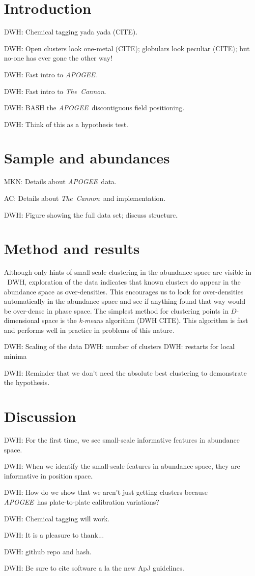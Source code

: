 \documentclass[12pt, letterpaper, preprint]{aastex}
\newcommand{\acronym}[1]{{\small{#1}}}
\newcommand{\project}[1]{\textsl{#1}}
\newcommand{\apogee}{\acronym{\project{APOGEE}}}
\newcommand{\thecannon}{\project{The~Cannon}}
\begin{document}
\section{Introduction}

DWH: Chemical tagging yada yada (CITE).

DWH: Open clusters look one-metal (CITE); globulars look peculiar (CITE); but no-one has ever gone the other way! 

DWH: Fast intro to \apogee.

DWH: Fast intro to \thecannon.

DWH: BASH the \apogee\ discontiguous field positioning.

DWH: Think of this as a hypothesis test.

\section{Sample and abundances}

MKN: Details about \apogee\ data.

AC: Details about \thecannon\ and implementation.

DWH: Figure showing the full data set; discuss structure.

\section{Method and results}

Although only hints of small-scale clustering in the abundance space
are visible in \figurename~DWH, exploration of the data indicates that
known clusters do appear in the abundance space as over-densities.
This encourages us to look for over-densities automatically in the
abundance space and see if anything found that way would be over-dense
in phase space.
The simplest method for clustering points in $D$-dimensional space is
the \emph{k-means} algorithm (DWH CITE).
This algorithm is fast and performs well in practice in problems of
this nature.

DWH: Scaling of the data
DWH: number of clusters
DWH: restarts for local minima

DWH: Reminder that we don't need the absolute best clustering to
demonstrate the hypothesis.

\section{Discussion}

DWH: For the first time, we see small-scale informative features in abundance space.

DWH: When we identify the small-scale features in abundance space, they are informative in position space.

DWH: How do we show that we aren't just getting clusters because \apogee\ has plate-to-plate calibration variations?

DWH: Chemical tagging will work.

\acknowledgements
DWH: It is a pleasure to thank...

DWH: github repo and hash.

DWH: Be sure to cite software a la the new ApJ guidelines.
\end{document}
